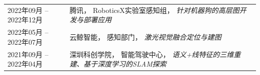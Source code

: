 %
%


 
			

\begin{tabular}{ll}	
	\textsc{2022年09月 -- 2022年12月}			  & 腾讯， RoboticsX实验室感知组， \emph{针对机器狗的高层图开发与部署应用}\\
	\textsc{2022年05月 -- 2022年07月} 	&  云鲸智能， 感知部门， \emph{激光视觉融合定位与建图}\\
	\textsc{2021年09月 -- 2022年04月} 	&  深圳科创学院， 智能驾驶中心， \emph{语义+线特征的三维重建、基于深度学习的SLAM探索}\\
									
\end{tabular}